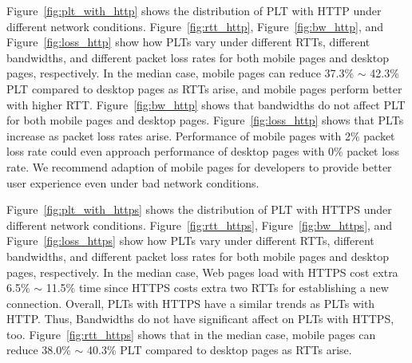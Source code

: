 \begin{figure*}[tbp]
\centering
{}
\caption{PLT with HTTP under different network .}
\label{fig:plt_with_http}
\end{figure*}

\begin{figure*}[tbp]
\centering
{}
\caption{PLT with HTTPS under different network .}
\label{fig:plt_with_https}
\end{figure*}

Figure~\ref{fig:plt_with_http} shows the distribution of PLT with HTTP under different network conditions. Figure~\ref{fig:rtt_http}, Figure~\ref{fig:bw_http}, and Figure~\ref{fig:loss_http} show how PLTs vary under different RTTs, different bandwidths, and different packet loss rates for both mobile pages and desktop pages, respectively. In the median case, mobile pages can reduce 37.3\% $\sim$ 42.3\% PLT compared to desktop pages as RTTs arise, and mobile pages perform better with higher RTT. Figure~\ref{fig:bw_http} shows that bandwidths do not affect PLT for both mobile pages and desktop pages. Figure~\ref{fig:loss_http} shows that PLTs increase as packet loss rates arise. Performance of mobile pages with 2\% packet loss rate could even approach performance of desktop pages with 0\% packet loss rate. We recommend adaption of mobile pages for developers to provide better user experience even under bad network conditions.


Figure~\ref{fig:plt_with_https} shows the distribution of PLT with HTTPS under different network conditions. Figure~\ref{fig:rtt_https}, Figure~\ref{fig:bw_https}, and Figure~\ref{fig:loss_https} show how PLTs vary under different RTTs, different bandwidths, and different packet loss rates for both mobile pages and desktop pages, respectively. In the median case, Web pages load with HTTPS cost extra 6.5\% $\sim$ 11.5\% time since HTTPS costs extra two RTTs for establishing a new connection. Overall, PLTs with HTTPS have a similar trends as PLTs with HTTP. Thus, Bandwidths do not have significant affect on PLTs with HTTPS, too. Figure~\ref{fig:rtt_https} shows that in the median case, mobile pages can reduce 38.0\% $\sim$ 40.3\% PLT compared to desktop pages as RTTs arise.

